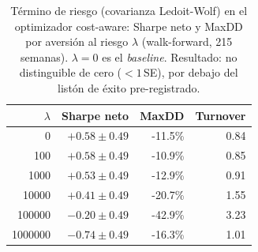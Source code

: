 \begin{table}[htbp]
\centering
\caption{T\'ermino de riesgo (covarianza Ledoit-Wolf) en el optimizador cost-aware: Sharpe neto y MaxDD por aversi\'on al riesgo $\lambda$ (walk-forward, 215 semanas). $\lambda=0$ es el \emph{baseline}. Resultado: no distinguible de cero ($<1$\,SE), por debajo del list\'on de \'exito pre-registrado.}
\label{tab:construction-risk}
\small
\begin{tabular}{rrrr}
\toprule
$\lambda$ & Sharpe neto & MaxDD & Turnover \\
\midrule
0 & $+0.58 \pm 0.49$ & -11.5\% & 0.84 \\
100 & $+0.58 \pm 0.49$ & -10.9\% & 0.85 \\
1000 & $+0.53 \pm 0.49$ & -12.9\% & 0.91 \\
10000 & $+0.41 \pm 0.49$ & -20.7\% & 1.55 \\
100000 & $-0.20 \pm 0.49$ & -42.9\% & 3.23 \\
1000000 & $-0.74 \pm 0.49$ & -16.3\% & 1.01 \\
\bottomrule
\end{tabular}
\end{table}

